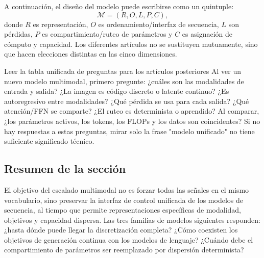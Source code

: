A continuación, el diseño del modelo puede escribirse como un quintuple:
$$
\mathcal{M}=(R, O, L, P, C),
$$
donde $R$ es representación, $O$ es ordenamiento/interfaz de secuencia, $L$ son pérdidas, $P$ es compartimiento/ruteo de parámetros y $C$ es asignación de cómputo y capacidad. Los diferentes artículos no se sustituyen mutuamente, sino que hacen elecciones distintas en las cinco dimensiones.

\begin{knowledgebox}{Leer la tabla unificada de preguntas para los artículos posteriores}
Al ver un nuevo modelo multimodal, primero pregunte: ¿cuáles son las modalidades de entrada y salida? ¿La imagen es código discreto o latente continuo? ¿Es autoregresivo entre modalidades? ¿Qué pérdida se usa para cada salida? ¿Qué atención/FFN se comparte? ¿El ruteo es determinista o aprendido? Al comparar, ¿los parámetros activos, los tokens, los FLOPs y los datos son coincidentes? Si no hay respuestas a estas preguntas, mirar solo la frase "modelo unificado" no tiene suficiente significado técnico.
\end{knowledgebox}

\subsection{Resumen de la sección}

El objetivo del escalado multimodal no es forzar todas las señales en el mismo vocabulario, sino preservar la interfaz de control unificada de los modelos de secuencia, al tiempo que permite representaciones específicas de modalidad, objetivos y capacidad dispersa. Las tres familias de modelos siguientes responden: ¿hasta dónde puede llegar la discretización completa? ¿Cómo coexisten los objetivos de generación continua con los modelos de lenguaje? ¿Cuándo debe el compartimiento de parámetros ser reemplazado por dispersión determinista?
